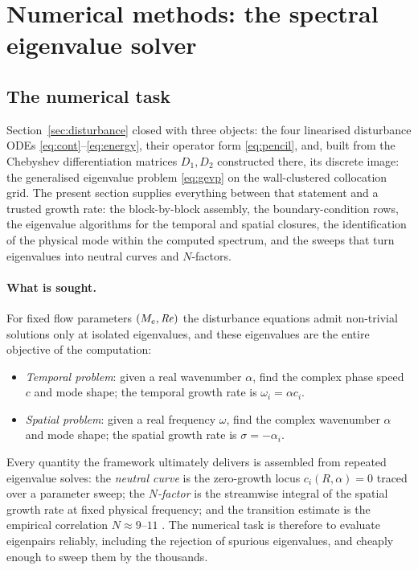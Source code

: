\documentclass[11pt]{article}
\begin{document}
\clearpage
\section{Numerical methods: the spectral eigenvalue solver}\label{sec:numerics}
\subsection{The numerical task}\label{sec:numtask}
Section~\ref{sec:disturbance} closed with three objects: the four linearised disturbance ODEs
\eqref{eq:cont}--\eqref{eq:energy}, their operator form \eqref{eq:pencil}, and, built from the
Chebyshev differentiation matrices $D_1,D_2$ constructed there, its discrete image: the
generalised eigenvalue problem \eqref{eq:gevp} on the wall-clustered collocation grid. The
present section supplies everything between that statement and a trusted growth rate: the block-by-block assembly, the boundary-condition rows, the eigenvalue algorithms
for the temporal and spatial closures, the identification of the physical mode within the computed
spectrum, and the sweeps that turn eigenvalues into neutral curves and $N$-factors.

\paragraph{What is sought.} For fixed flow parameters $(M_e,\mathit{Re})$ the disturbance equations admit
non-trivial solutions only at isolated eigenvalues, and these eigenvalues are the entire objective of
the computation:
\begin{itemize}[nosep,leftmargin=1.6em]
  \item \emph{Temporal problem}: given a real wavenumber $\alpha$, find the complex phase speed $c$
        and mode shape; the temporal growth rate is $\omega_i=\alpha c_i$.
  \item \emph{Spatial problem}: given a real frequency $\omega$, find the complex wavenumber
        $\alpha$ and mode shape; the spatial growth rate is $\sigma=-\alpha_i$.
\end{itemize}
Every quantity the framework ultimately delivers is assembled from repeated eigenvalue solves: the
\emph{neutral curve} is the zero-growth locus $c_i(R,\alpha)=0$ traced over a parameter sweep; the
\emph{$N$-factor} is the streamwise integral of the spatial growth rate at fixed physical frequency;
and the transition estimate is the empirical correlation $N\approx9$--$11$
\cite{smith1956,vaningen1956}. The numerical task is therefore to evaluate eigenpairs reliably,
including the rejection of spurious eigenvalues, and cheaply enough to sweep them by the thousands.
\end{document}
